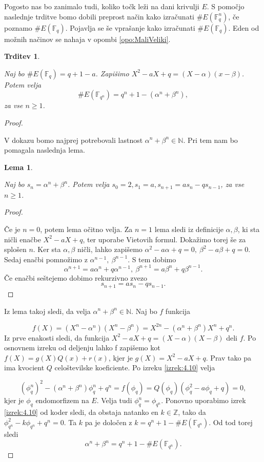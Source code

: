 \documentclass[12pt,a4paper,twoside]{article}
\theoremstyle{definition} %
\theoremstyle{plain} %
\newtheorem{lema}[definicija]{Lema}
\newtheorem{trditev}[definicija]{Trditev}
\numberwithin{equation}{section}  %
\newcommand{\N}{\mathbb N}
\newcommand{\Z}{\mathbb Z}
\newcommand{\F}{\mathbb F}
\newcommand{\E}[1]{E({#1})}
\begin{document}
Pogosto nas bo zanimalo tudi, koliko točk leži na dani krivulji $E$. S pomočjo naslednje trditve bomo dobili preprost način kako izračunati $\# \E{\F_q^n}$, če poznamo $\# \E{\F_q}$.
Pojavlja se še vprašanje kako izračunati $\# \E{\F_q}$. Eden od možnih načinov se nahaja v opombi \ref{opo:MaliVeliki}.




\begin{trditev}~

\label{trd:red}

Naj bo $\# \E{\F_q} = q+1-a$. Zapišimo $X^2-aX+q = (X-\alpha)(x-\beta)$. Potem velja
$$\# \E{\F_{q^{n}}} = q^n+1-(\alpha^n+\beta^n),$$
za vse $n \geq 1$.

\end{trditev}

\begin{proof}~

V dokazu bomo najprej potrebovali lastnost $\alpha^n+\beta^n \in \N$. Pri tem nam bo pomagala naslednja lema.


\begin{lema}~

\label{lema:4.13}
Naj bo $s_n = \alpha^n +  \beta^n$. Potem velja $s_0 = 2,s_1 = a, s_{n+1} = as_n-qs_{n-1}$, za vse $n \geq 1$.

\end{lema}

\begin{proof}~

Če je $n = 0$, potem lema očitno velja. Za $n=1$ lema sledi iz definicije $\alpha,\beta$, ki sta ničli enačbe $X^2-aX+q$, ter uporabe Vietovih formul. Dokažimo torej še za splošen $n$.
Ker sta $\alpha,\beta$ ničli, lahko zapišemo $\alpha^2-a\alpha +q = 0,\  \beta^2-a\beta+q=0$. Sedaj enačbi pomnožimo z $\alpha^{n-1},\ \beta^{n-1}$. S tem dobimo
$$\alpha^{n+1} = a\alpha^n +q\alpha^{n-1},\ \beta^{n+1} = a\beta^n +q\beta^{n-1}.$$
Če enačbi seštejemo dobimo rekurzivno zvezo
$$s_{n+1} = as_n-qs_{n-1}.$$
\end{proof}

Iz lema takoj sledi, da velja $\alpha^n+\beta^n \in \N$. Naj bo $f$ funkcija

$$f(X) = (X^n-\alpha^n)(X^n-\beta^n) = X^{2n}-(\alpha^n+\beta^n)X^n+q^n.$$
Iz prve enakosti sledi, da funkcija $X^2-aX+q = (X-\alpha)(X-\beta)$ deli $f$. Po osnovnem izreku od deljenju lahko f zapišemo kot $f(X) = g(X)Q(x)+r(x)$, kjer je $g(X)= X^2-aX+q$. Prav tako pa ima kvocient $Q$ celoštevilske koeficiente. Po izreku \ref{izrek:4.10} velja

$$(\phi^n_q)^2 -(\alpha^n+\beta^n)\phi^n_q + q^n = f(\phi_q) = Q(\phi_q)(\phi^2_q-a\phi_q+q) = 0,$$
kjer je $\phi_q$ endomorfizem na $E$. Velja tudi $\phi^n_q = \phi_{q^n}$. Ponovno uporabimo izrek \ref{izrek:4.10} od koder sledi, da obstaja natanko en $k \in \Z$, tako da 
$\phi^2_{q^n}-k\phi_{q^n}+q^n=0$. Ta $k$ pa je določen z $k = q^n+1-\#\E{\F_{q^n}}$. Od tod torej sledi
$$\alpha^n+\beta^n = q^n+1-\#\E{\F_{q^n}}.$$

\end{proof}
\end{document}
